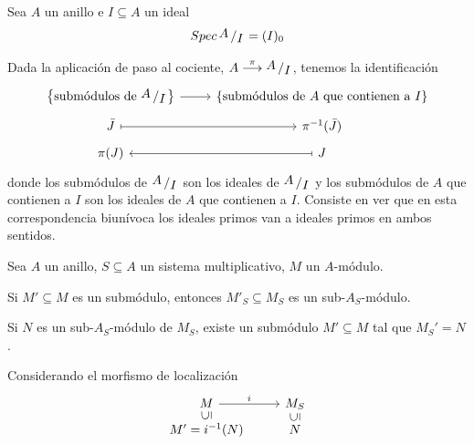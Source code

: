 \begin{ejer}Sea $A$ un anillo e $I \subseteq A$ un ideal
$$Spec\, \modulo{A}{I} = (I)_0$$
\end{ejer}
\begin{dem}
    Dada la aplicaci\'on de paso al cociente, $A \overset{\pi}{\longrightarrow} \modulo{A}{I}$, tenemos la 
    identificaci\'on
    $$\bt \left\{\text{subm\'odulos de } \modulo{A}{I}\right\} \rar & \{\text{subm\'odulos de } A \text{ que contienen a }I\} \\[-5mm] \bar J \rar[mapsto] & \pi^{-1}(\bar J) \\[-5mm] \pi(J) & \arrow[mapsto]{l} J
    \et$$
    donde los subm\'odulos de $\modulo{A}{I}$ son los ideales de $\modulo{A}{I}$ y los subm\'odulos de $A$ que 
    contienen a $I$ son los ideales de $A$ que contienen a $I$.       
    Consiste en ver que en esta correspondencia biun\'ivoca los ideales primos van a ideales primos en ambos sentidos.
\end{dem}
\begin{prop}
    Sea $A$ un anillo, $S \subseteq A$ un sistema multiplicativo, $M$ un $A$-m\'odulo. 

    Si $M ' \subseteq M$ es un subm\'odulo, entonces $M'_S \subseteq M_S$ es un sub-$A_S$-m\'odulo.

    Si $N$ es un sub-$A_S$-m\'odulo de $M_S$, existe un subm\'odulo $M'\subseteq M$ tal que $M_S'=N$.

    Considerando el morfismo de localizaci\'on 
$$\bt M \rar{i} & M_S \\[-5mm] M' = i^{-1}(N) \arrow[u, phantom, "{\rotatebox{90}{$\subseteq$}}"] & N \arrow[u, phantom, "{\rotatebox{90}{$\subseteq$}}"]  \et$$\end{prop}


